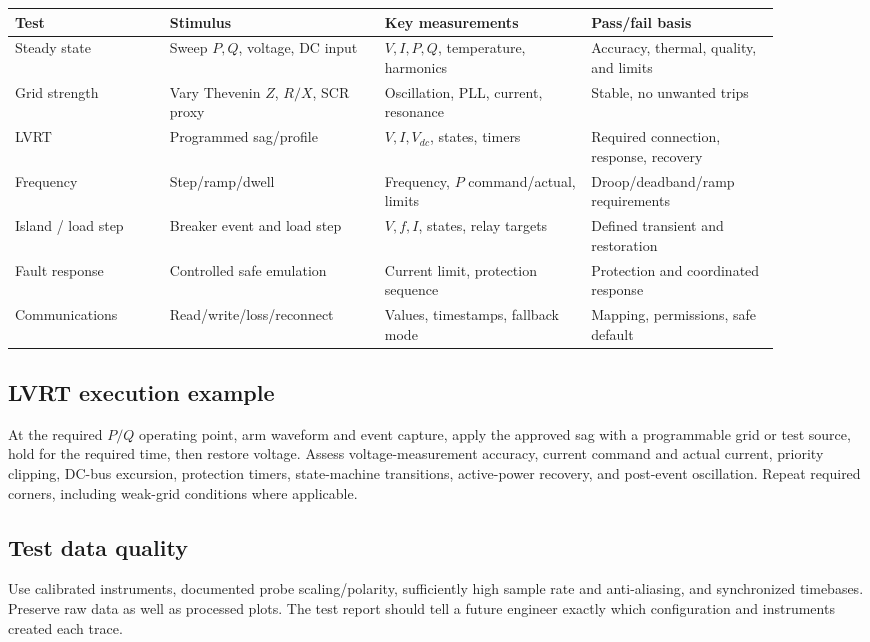 \documentclass[11pt]{article}
\begin{document}
\begin{longtable}{p{0.18\linewidth}p{0.25\linewidth}p{0.24\linewidth}p{0.22\linewidth}}
\toprule
Test & Stimulus & Key measurements & Pass/fail basis \\
\midrule
Steady state & Sweep $P,Q$, voltage, DC input & $V,I,P,Q$, temperature, harmonics & Accuracy, thermal, quality, and limits \\
Grid strength & Vary Thevenin $Z$, $R/X$, SCR proxy & Oscillation, PLL, current, resonance & Stable, no unwanted trips \\
LVRT & Programmed sag/profile & $V,I,V_{dc}$, states, timers & Required connection, response, recovery \\
Frequency & Step/ramp/dwell & Frequency, $P$ command/actual, limits & Droop/deadband/ramp requirements \\
Island / load step & Breaker event and load step & $V,f,I$, states, relay targets & Defined transient and restoration \\
Fault response & Controlled safe emulation & Current limit, protection sequence & Protection and coordinated response \\
Communications & Read/write/loss/reconnect & Values, timestamps, fallback mode & Mapping, permissions, safe default \\
\bottomrule
\end{longtable}

\subsection{LVRT execution example}
At the required $P/Q$ operating point, arm waveform and event capture, apply
the approved sag with a programmable grid or test source, hold for the required
time, then restore voltage. Assess voltage-measurement accuracy, current command
and actual current, priority clipping, DC-bus excursion, protection timers,
state-machine transitions, active-power recovery, and post-event oscillation.
Repeat required corners, including weak-grid conditions where applicable.

\subsection{Test data quality}
Use calibrated instruments, documented probe scaling/polarity, sufficiently high
sample rate and anti-aliasing, and synchronized timebases. Preserve raw data as
well as processed plots. The test report should tell a future engineer exactly
which configuration and instruments created each trace.
\end{document}
